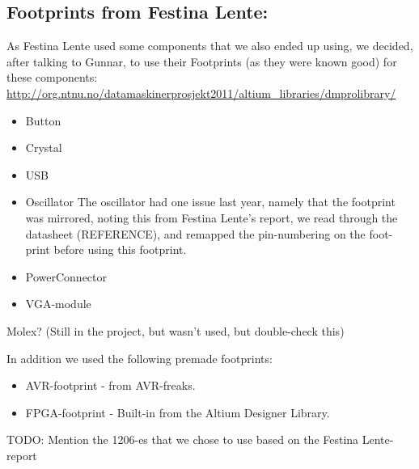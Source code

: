 \subsection {Footprints from Festina Lente:}
As Festina Lente used some components that we also ended up using, we decided,
after talking to Gunnar, to use their Footprints (as they were known good) for these
components:
\url{http://org.ntnu.no/datamaskinerprosjekt2011/altium_libraries/dmprolibrary/}
\begin {itemize}
\item Button
\item Crystal
\item USB
\item Oscillator
The oscillator had one issue last year, namely that the footprint was mirrored,
noting this from Festina Lente's report, we read through the datasheet (REFERENCE),
and remapped the pin-numbering on the foot-print before using this footprint.
\item PowerConnector
\item VGA-module
\end {itemize}
Molex? (Still in the project, but wasn't used, but double-check this)

In addition we used the following premade footprints:
\begin {itemize}
\item AVR-footprint - from AVR-freaks.
\item FPGA-footprint - Built-in from the Altium Designer Library.
\end {itemize}

TODO: Mention the 1206-es that we chose to use based on the Festina Lente-report
